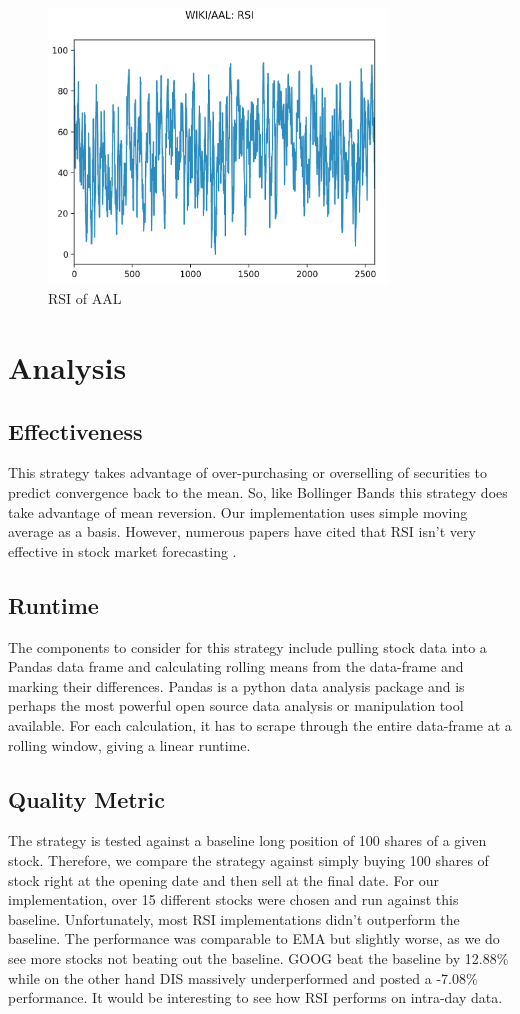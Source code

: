 \documentclass[letterpaper,11pt]{article}
\begin{document}
\begin{figure}[ht!]
\centering
\includegraphics[width=90mm]{AAL_RSI.png}
\caption{ RSI of AAL \label{overflow}}
\end{figure}

\section*{Analysis}

\subsection*{Effectiveness}
This strategy takes advantage of over-purchasing or overselling of securities to predict convergence back to the mean. So, like Bollinger Bands this strategy does take advantage of mean reversion. Our implementation uses simple moving average as a basis. However, numerous papers have cited that RSI isn't very effective in stock market forecasting \cite{Chong2014}.

\subsection*{Runtime}
The components to consider for this strategy include pulling stock data into a Pandas data frame and calculating rolling means from the data-frame and marking their differences. Pandas is a python data analysis package and is perhaps the most powerful open source data analysis or manipulation tool available. For each calculation, it has to scrape through the entire data-frame at a rolling window, giving a linear runtime.

\subsection*{Quality Metric}
The strategy is tested against a baseline long position of 100 shares of a given stock. Therefore, we compare the strategy against simply buying 100 shares of stock right at the opening date and then sell at the final date. For our implementation, over 15 different stocks were chosen and run against this baseline. Unfortunately, most RSI implementations didn't outperform the baseline. The performance was comparable to EMA but slightly worse, as we do see more stocks not beating out the baseline. GOOG beat the baseline by 12.88\% while on the other hand DIS massively underperformed and posted a -7.08\% performance. It would be interesting to see how RSI performs on intra-day data.
\end{document}
